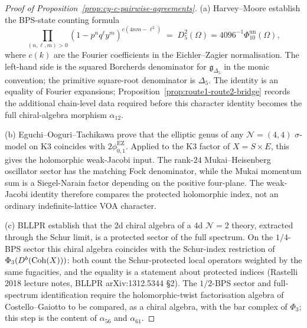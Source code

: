 \begin{proof}[Proof of Proposition~\ref{prop:cy-c-pairwise-agreements}]
(a) Harvey--Moore establish the BPS-state counting formula
\[
 \prod_{(n, \ell, m) > 0} (1 - p^n q^\ell y^m)^{c(4nm - \ell^2)}
 \;=\; D_5^2(\Omega)=4096^{-1}\Phi_{10}^{\mathrm{un}}(\Omega),
\]
where \(c(k)\) are the Fourier coefficients in the Eichler--Zagier normalisation. The left-hand side is the squared Borcherds denominator for \(\mathfrak g_{\Delta_5}\) in the monic convention; the primitive square-root denominator is \(\Delta_5\). The identity is an equality of Fourier expansions; Proposition~\ref{prop:route1-route2-bridge} records the additional chain-level data required before this character identity becomes the full chiral-algebra morphism $\alpha_{12}$.

(b) Eguchi--Ooguri--Tachikawa prove that the elliptic genus of any $\mathcal{N} = (4, 4)$ $\sigma$-model on K3 coincides with \(2\phi_{0,1}^{\mathrm{EZ}}\). Applied to the K3 factor of \(X=S\times E\), this gives the holomorphic weak-Jacobi input. The rank-$24$ Mukai--Heisenberg oscillator sector has the matching Fock denominator, while the Mukai momentum sum is a Siegel-Narain factor depending on the positive four-plane. The weak-Jacobi identity therefore compares the protected holomorphic index, not an ordinary indefinite-lattice VOA character.

(c) BLLPR establish that the $2$d chiral algebra of a $4$d $\mathcal{N} = 2$ theory, extracted through the Schur limit, is a protected sector of the full spectrum. On the $1/4$-BPS sector this chiral algebra coincides with the Schur-index restriction of $\Phi_3(D^b(\mathrm{Coh}(X)))$: both count the Schur-protected local operators weighted by the same fugacities, and the equality is a statement about protected indices (Rastelli 2018 lecture notes, BLLPR arXiv:1312.5344 \S2). The $1/2$-BPS sector and full-spectrum identification require the holomorphic-twist factorisation algebra of Costello--Gaiotto to be compared, as a chiral algebra, with the bar complex of $\Phi_3$; this step is the content of $\alpha_{56}$ and $\alpha_{61}$.
\end{proof}

